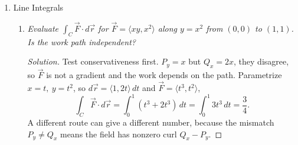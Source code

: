 \documentclass[12pt]{article}
\newenvironment{solution}
  {\renewcommand\qedsymbol{$\blacksquare$}\begin{proof}[Solution]}
  {\end{proof}}
\begin{document}
\begin{enumerate}
\begin{enumerate}
    \item \textit{Volume inside the cylinder $x^2+y^2=1$, below $z=4$, above $z=1-x^2-y^2$, in cylindrical.}

    \begin{solution}
    Cylindrical coordinates fit this region, a disk with one surface below and one above. The floor is $z=1-r^2$, the ceiling flat at $z=4$,
    \[
      V=\int_0^{2\pi}\int_0^1\int_{1-r^2}^4 r\,dz\,dr\,d\theta=2\pi\int_0^1 r(3+r^2)\,dr=\frac{7\pi}{2}.
    \]
    The height $3+r^2$ is the gap between ceiling and floor, taller near the rim where the dome has dropped away.
    \end{solution}

    \item \textit{First octant region inside $x^2+y^2+z^2=4$, constant density. Find $\bar z$.}

    \begin{solution}
    Spherical suits a ball, with $0\le\rho\le2$ and $0\le\phi,\theta\le\pi/2$, and $dV=\rho^2\sin\phi\,d\rho\,d\phi\,d\theta$. A constant density cancels in $\bar z$, so take it to be $1$. The mass is $m=\tfrac{4\pi}{3}$, and
    \[
      M_{xy}=\int_0^{\pi/2}\!d\theta\int_0^{\pi/2}\!\cos\phi\sin\phi\,d\phi\int_0^2\!\rho^3\,d\rho=\frac{\pi}{2}\cdot\frac12\cdot4=\pi,
    \]
    so $\bar z=M_{xy}/m=\dfrac{3}{4}$. The centroid sits below the midpoint height $z=1$ because the wedge holds more material low and wide than high and narrow.
    \end{solution}

    \end{enumerate}
\newpage

\item Line Integrals

    \begin{enumerate}
    \item \textit{Evaluate $\displaystyle\int_C\vec F\cdot d\vec r$ for $\vec F=\langle xy,x^2\rangle$ along $y=x^2$ from $(0,0)$ to $(1,1)$. Is the work path independent?}

    \begin{solution}
    Test conservativeness first. $P_y=x$ but $Q_x=2x$, they disagree, so $\vec F$ is not a gradient and the work depends on the path. Parametrize $x=t,\ y=t^2$, so $d\vec r=\langle1,2t\rangle\,dt$ and $\vec F=\langle t^3,t^2\rangle$,
    \[
      \int_C\vec F\cdot d\vec r=\int_0^1(t^3+2t^3)\,dt=\int_0^1 3t^3\,dt=\frac34.
    \]
    A different route can give a different number, because the mismatch $P_y\ne Q_x$ means the field has nonzero curl $Q_x-P_y$.
    \end{solution}


\end{enumerate}
\end{enumerate}
\end{document}
